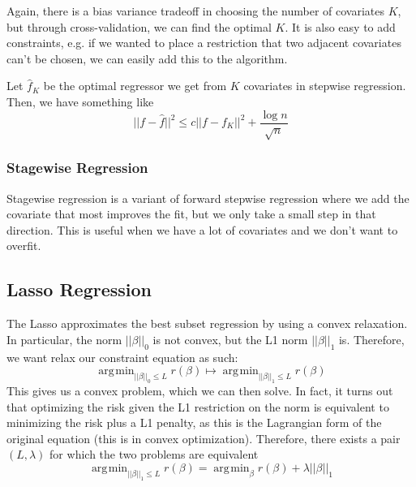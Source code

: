 \documentclass{article}
\DeclareMathOperator*{\argmin}{\arg\!\min}
\begin{document}
    Again, there is a bias variance tradeoff in choosing the number of covariates $K$, but through cross-validation, we can find the optimal $K$. It is also easy to add constraints, e.g. if we wanted to place a restriction that two adjacent covariates can't be chosen, we can easily add this to the algorithm. 

    \begin{theorem}
      Let $\hat{f}_K$ be the optimal regressor we get from $K$ covariates in stepwise regression. Then, we have something like
      \begin{equation}
        ||f - \hat{f}||^2 \leq c ||f - f_K||^2 + \frac{\log{n}}{\sqrt{n}}
      \end{equation}
    \end{theorem}

    \subsubsection{Stagewise Regression} 

      Stagewise regression is a variant of forward stepwise regression where we add the covariate that most improves the fit, but we only take a small step in that direction. This is useful when we have a lot of covariates and we don't want to overfit. 

  \subsection{Lasso Regression}

    The Lasso approximates the best subset regression by using a convex relaxation. In particular, the norm $||\beta||_0$ is not convex, but the L1 norm $||\beta||_1$ is. Therefore, we want relax our constraint equation as such: 
    \begin{equation}
      \argmin_{||\beta||_0 \leq L} r(\beta) \mapsto \argmin_{||\beta||_1 \leq L} r(\beta)
    \end{equation}
    This gives us a convex problem, which we can then solve. In fact, it turns out that optimizing the risk given the L1 restriction on the norm is equivalent to minimizing the risk plus a L1 penalty, as this is the Lagrangian form of the original equation (this is in convex optimization). Therefore, there exists a pair $(L, \lambda)$ for which the two problems are equivalent 
    \begin{equation}
      \argmin_{||\beta||_1 \leq L} r(\beta) = \argmin_{\beta} r(\beta) + \lambda ||\beta||_1
    \end{equation}
\end{document}
